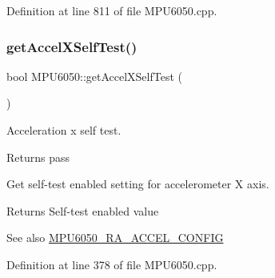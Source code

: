 Definition at line 811 of file M\+P\+U6050.\+cpp.


\begin{DoxyCode}{0}

\end{DoxyCode}
\mbox{\label{classMPU6050_a8fc7eab1302281f6e4bc953379f3237b}} 
\subsubsection{\texorpdfstring{getAccelXSelfTest()}{getAccelXSelfTest()}}
{\footnotesize\ttfamily bool M\+P\+U6050\+::get\+Accel\+X\+Self\+Test (\begin{DoxyParamCaption}{ }\end{DoxyParamCaption})}

Acceleration x self test.

\begin{DoxyReturn}{Returns}
pass
\end{DoxyReturn}
Get self-\/test enabled setting for accelerometer X axis. \begin{DoxyReturn}{Returns}
Self-\/test enabled value 
\end{DoxyReturn}
\begin{DoxySeeAlso}{See also}
\mbox{\hyperlink{MPU6050_8h_a48b7d7b24a70b247e373bc5965a5dcc7}{M\+P\+U6050\+\_\+\+R\+A\+\_\+\+A\+C\+C\+E\+L\+\_\+\+C\+O\+N\+F\+IG}} 
\end{DoxySeeAlso}


Definition at line 378 of file M\+P\+U6050.\+cpp.


